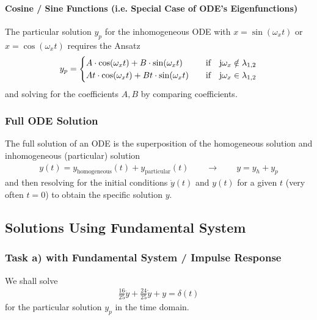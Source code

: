 \documentclass[11pt,a4paper,DIV=12]{scrartcl}
\begin{document}
\paragraph{Cosine / Sine Functions (i.e. Special Case of ODE's Eigenfunctions)}
\label{Sec:CosSineAnsatzInhomo}
The particular solution $y_p$ for the inhomogeneous ODE with
$x=\sin(\omega_x t)$ or $x=\cos(\omega_x t)$
requires the Ansatz
\begin{align}
y_p =
\begin{cases}
A \cdot \cos(\omega_x t) + B \cdot \sin(\omega_x t)&\quad \text{if}
\quad \im \omega_x \notin \lambda_{1,2}\\
A t \cdot \cos(\omega_x t) + B t \cdot \sin(\omega_x t)&\quad \text{if}
\quad \im \omega_x \in \lambda_{1,2}
\end{cases}
\end{align}
and solving for the coefficients $A, B$ by comparing coefficients.



\subsubsection{Full ODE Solution}
The full solution of an ODE is the superposition of the homogeneous solution
and inhomogeneous (particular) solution
\begin{align}
y(t) = y_\text{homogeneous}(t)+y_\text{particular}(t) \qquad \rightarrow \qquad
y = y_h + y_p
\end{align}
and then resolving for the initial conditions $\dot{y}(t)$ and $y(t)$ for a
given $t$ (very often $t=0$) to obtain the specific solution $y$.



\newpage
\subsection{Solutions Using Fundamental System}
\label{sec:SolutionsUsingFundameltalSystem}


\subsubsection{Task a) with Fundamental System / Impulse Response}
We shall solve
\begin{align}
\frac{16}{25} \ddot{y} + \frac{24}{25} \dot{y} + y = \delta(t)
\end{align}
for the particular solution $y_p$ in the time domain.
\end{document}
